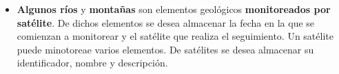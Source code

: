 \documentclass{article}
\begin{document}
\begin{enumerate}[label = (\alph*)]
{\begin{itemize}
{                    \textbf{origen volcánico} o de \textbf{plegamiento}. En
                    el caso de que su origen sea volcánico, se desea 
                    almacenar el tipo de volcán y si es plegamiento, se 
                    almacenará el periodo geológico de dicho plegamiento.
                }
                \item {
                    \textbf{Algunos ríos} y \textbf{montañas} son elementos 
                    geológicos \textbf{monitoreados por satélite}. De dichos 
                    elementos se desea almacenar la fecha en la que se 
                    comienzan a monitorear y el satélite que realiza el 
                    seguimiento. Un satélite puede minotoreae varios 
                    elementos. De satélites se desea almacenar su 
                    identificador, nombre y descripción.
                }
            \end{itemize}
            
}
\end{enumerate}
\end{document}
